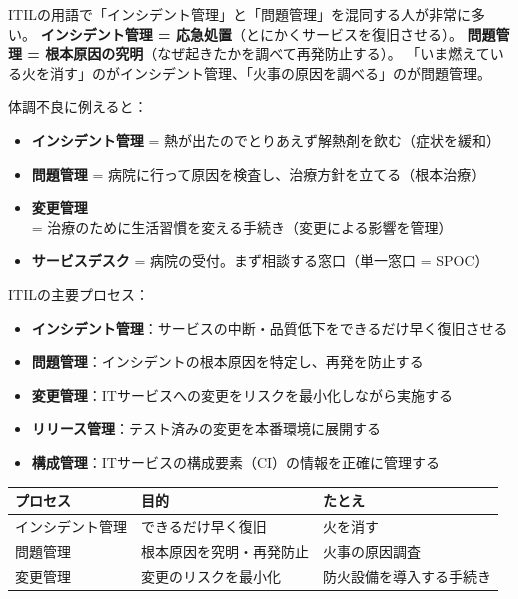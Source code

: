 \mondaipage
{}

\begin{stumble}
ITILの用語で「インシデント管理」と「問題管理」を混同する人が非常に多い。
\textbf{インシデント管理 = 応急処置}（とにかくサービスを復旧させる）。
\textbf{問題管理 = 根本原因の究明}（なぜ起きたかを調べて再発防止する）。
「いま燃えている火を消す」のがインシデント管理、「火事の原因を調べる」のが問題管理。
\end{stumble}

\begin{analogy}
体調不良に例えると：
\begin{itemize}
  \item \textbf{インシデント管理} = 熱が出たのでとりあえず解熱剤を飲む（症状を緩和）
  \item \textbf{問題管理} = 病院に行って原因を検査し、治療方針を立てる（根本治療）
  \item \textbf{変更管理} = 治療のために生活習慣を変える手続き（変更による影響を管理）
  \item \textbf{サービスデスク} = 病院の受付。まず相談する窓口（単一窓口 = SPOC）
\end{itemize}
\end{analogy}

\begin{keypoint}
ITILの主要プロセス：
\begin{itemize}
  \item \textbf{インシデント管理}：サービスの中断・品質低下をできるだけ早く復旧させる
  \item \textbf{問題管理}：インシデントの根本原因を特定し、再発を防止する
  \item \textbf{変更管理}：ITサービスへの変更をリスクを最小化しながら実施する
  \item \textbf{リリース管理}：テスト済みの変更を本番環境に展開する
  \item \textbf{構成管理}：ITサービスの構成要素（CI）の情報を正確に管理する
\end{itemize}
\end{keypoint}

\begin{comparison}
\begin{tabularx}{\textwidth}{lXX}
  \toprule
  \textbf{プロセス} & \textbf{目的} & \textbf{たとえ} \\
  \midrule
  インシデント管理 & できるだけ早く復旧 & 火を消す \\
  問題管理 & 根本原因を究明・再発防止 & 火事の原因調査 \\
  変更管理 & 変更のリスクを最小化 & 防火設備を導入する手続き \\
  \bottomrule
\end{tabularx}
\end{comparison}

